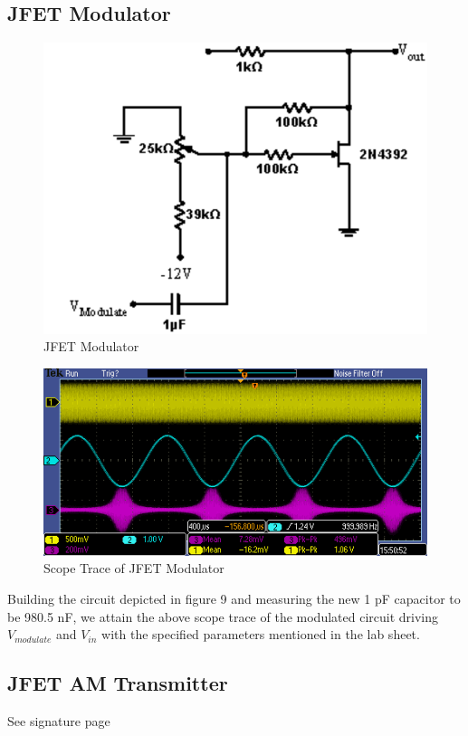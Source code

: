\documentclass{article}
\begin{document}
\subsection{JFET Modulator}
    \begin{figure}[H]
        \centering
        \includegraphics[scale = 0.6]{5_9.png}
        \caption{JFET Modulator~\cite{webfig}}
        \label{fig:my_label}
    \end{figure}
    \begin{figure}[H]
        \centering
        \includegraphics[scale = 0.6]{tek00003.PNG}
        \caption{Scope Trace of JFET Modulator}
        \label{fig:my_label}
    \end{figure}
    Building the circuit depicted in figure 9 and measuring the new 1 pF capacitor to be 980.5 nF, we attain the above scope trace of the modulated circuit driving $V_{modulate}$ and $V_{in}$ with the specified parameters mentioned in the lab sheet.
\subsection{JFET AM Transmitter}
    See signature page
\end{document}
